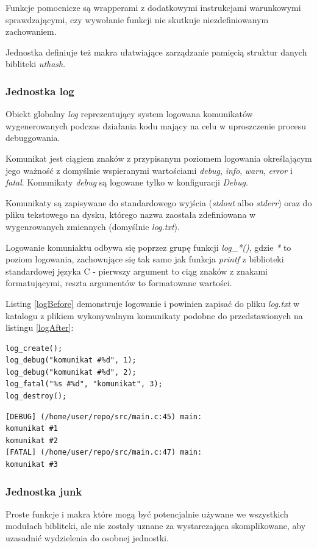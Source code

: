 Funkcje pomocnicze są wrapperami z dodatkowymi instrukcjami warunkowymi sprawdzającymi, czy wywołanie funkcji nie skutkuje niezdefiniowanym zachowaniem.

Jednostka definiuje też makra ułatwiające zarządzanie pamięcią struktur danych bibliteki \textit{uthash}.


\subsubsection{Jednostka log}
Obiekt globalny \textit{log} reprezentujący system logowana komunikatów wygenerowanych podczas działania kodu mający na celu w uproszczenie procesu debuggowania.

Komunikat jest ciągiem znaków z przypisanym poziomem logowania określającym jego ważność z domyślnie wspieranymi wartościami \textit{debug}, \textit{info}, \textit{warn}, \textit{error} i \textit{fatal}.
Komunikaty \textit{debug} są logowane tylko w konfiguracji \textit{Debug}.

Komunikaty są zapisywane do standardowego wyjścia (\textit{stdout} albo \textit{stderr}) oraz do pliku tekstowego na dysku, którego nazwa zaostała zdefiniowana w wygenrowanych zmiennych (domyślnie \textit{log.txt}).

Logowanie komuniaktu odbywa się poprzez grupę funkcji \textit{log\_*()}, gdzie \textit{*} to poziom logowania, zachowujące się tak samo jak funkcja \textit{printf} z biblioteki standardowej języka C - pierwszy argument to ciąg znaków z znakami formatującymi, reszta argumentów to formatowane wartości.

Listing \ref{logBefore} demonstruje logowanie i powinien zapisać do pliku \textit{log.txt} w katalogu z plikiem wykonywalnym komunikaty podobne do przedstawionych na listingu \ref{logAfter}:
\lstset{language=C}
\begin{lstlisting}[caption={Demonstracja logowania},captionpos=b,label={logBefore}]
log_create();
log_debug("komunikat #%d", 1);
log_debug("komunikat #%d", 2);
log_fatal("%s #%d", "komunikat", 3);
log_destroy();
\end{lstlisting}

\lstset{language=verbatim}
\begin{lstlisting}[caption={Wynik logowania},captionpos=b,label={logAfter}]
[DEBUG] (/home/user/repo/src/main.c:45) main:
komunikat #1
komunikat #2
[FATAL] (/home/user/repo/src/main.c:47) main:
komunikat #3
\end{lstlisting}

\subsubsection{Jednostka junk}
Proste funkcje i makra które mogą być potencjalnie używane we wszystkich modułach bibliteki, ale nie zostały uznane za wystarczająca skomplikowane, aby uzasadnić wydzielenia do osobnej jednostki.

